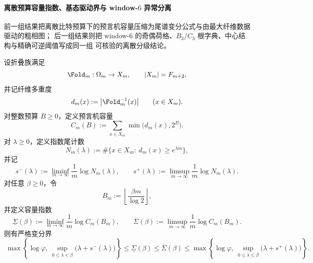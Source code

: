 
\paragraph{离散预算容量指数、基态驱动界与 window-\texorpdfstring{$6$}{6} 异常分离}
前一组结果把离散比特预算下的预言机容量压缩为尾谱变分公式与由最大纤维数据驱动的粗相图；
后一组结果则把 window-\(6\) 的奇偶荷格、\(B_3/C_3\) 根字典、中心结构与精确可逆阈值写成同一组
可核验的离散分级结论。

\begin{theorem}[预言机容量指数的尾谱变分界]\label{thm:xi-oracle-capacity-exponent-tail-variational-bounds}
设折叠族满足
\[
\Fold_m:\Omega_m\to X_m,
\qquad
|X_m|=F_{m+2},
\]
并记纤维多重度
\[
d_m(x):=\bigl|\Fold_m^{-1}(x)\bigr|
\qquad(x\in X_m).
\]
对整数预算 \(B\ge 0\)，定义预言机容量
\[
C_m(B):=\sum_{x\in X_m}\min\!\bigl(d_m(x),2^B\bigr).
\]
对 \(\lambda\ge 0\)，定义指数尾计数
\[
N_m(\lambda):=\#\{x\in X_m:\ d_m(x)\ge e^{\lambda m}\},
\]
并记
\[
s^{-}(\lambda):=\liminf_{m\to\infty}\frac1m\log N_m(\lambda),
\qquad
s^{+}(\lambda):=\limsup_{m\to\infty}\frac1m\log N_m(\lambda).
\]
对任意 \(\beta\ge 0\)，令
\[
B_m:=\left\lfloor \frac{\beta m}{\log 2}\right\rfloor,
\]
并定义容量指数
\[
\underline\Sigma(\beta):=\liminf_{m\to\infty}\frac1m\log C_m(B_m),
\qquad
\overline\Sigma(\beta):=\limsup_{m\to\infty}\frac1m\log C_m(B_m).
\]
则有严格变分界
\[
\boxed{\;
\max\!\left\{\log\varphi,\ \sup_{0\le \lambda<\beta}\bigl(\lambda+s^{-}(\lambda)\bigr)\right\}
\le
\underline\Sigma(\beta)
\le
\overline\Sigma(\beta)
\le
\max\!\left\{\log\varphi,\ \sup_{0\le \lambda\le \beta}\bigl(\lambda+s^{+}(\lambda)\bigr)\right\}. \;}
\]
\end{theorem}
